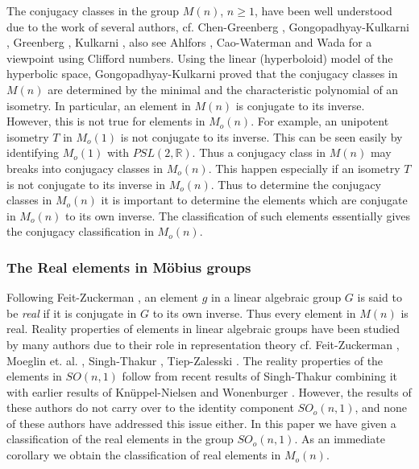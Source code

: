 \documentclass[11pt]{amsart}
\theoremstyle{definition}
\theoremstyle{remark}
\numberwithin{equation}{section}
\theoremstyle{plain}
\begin{document}
The conjugacy classes in the group $M(n)$, $n \geq 1$,  have been well understood due to the work of several authors, cf. Chen-Greenberg \cite{cg}, Gongopadhyay-Kulkarni \cite{kg},  Greenberg \cite{greenberg}, Kulkarni \cite{kulkarni}, also see Ahlfors \cite{ahlfors}, Cao-Waterman \cite{cw} and Wada \cite{wada} for a viewpoint using Clifford numbers. Using the linear (hyperboloid) model of the hyperbolic space, Gongopadhyay-Kulkarni \cite[Theorem 1.2]{kg}  proved that the conjugacy classes in $M(n)$ are determined by the minimal and the characteristic polynomial of an isometry. In particular, an element in $M(n)$ is conjugate to its inverse. However, this is not true for elements in $M_o(n)$. For example, an unipotent isometry $T$ in $M_o(1)$ is not conjugate to its inverse. This can be seen easily by identifying $M_o(1)$ with $PSL(2, {\mathbb R})$. Thus a conjugacy class in $M(n)$ may breaks into conjugacy classes in $M_o(n)$.  This happen especially if an isometry $T$ is not conjugate to its inverse in $M_o(n)$. Thus to determine the conjugacy classes in $M_o(n)$ it is important to determine the elements which are conjugate in $M_o(n)$ to its own inverse. The classification of such elements essentially gives the conjugacy classification in $M_o(n)$. 

\subsubsection*{The Real elements in M\"obius groups}Following Feit-Zuckerman \cite{fz}, an element $g$ in a linear algebraic group $G$ 
is said to be \emph{real} if it is conjugate in $G$ to its own inverse. Thus every element in $M(n)$  is real. Reality properties of elements in linear algebraic groups have been studied by many authors due to their role in representation theory 
cf. Feit-Zuckerman  \cite{fz}, Moeglin et. al. \cite{mvw}, Singh-Thakur \cite{st1, st2}, 
Tiep-Zalesski \cite{tz}. The reality properties of the elements in $SO(n,1)$ follow from recent results of Singh-Thakur \cite[Theorem 3.4.6]{st1} combining it with earlier results of Kn\"uppel-Nielsen \cite{kn} and Wonenburger \cite{w}. However, the results of these authors do not carry over to the identity component $SO_o(n,1)$, and none of these authors have addressed this issue either. In this paper we have given a classification of the real elements in the group $SO_o(n,1)$. As an immediate corollary we obtain the classification of real elements in $M_o(n)$. 
\end{document}
